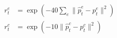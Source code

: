 \documentclass[border=8pt,12pt]{standalone}
\begin{document}
\color{ink}
$\displaystyle \begin{aligned}r_t^e&=\exp\!\left(-40\sum_e\|\hat p_t^e-p_t^e\|^2\right)\\ r_t^c&=\exp\!\left(-10\|\hat p_t^c-p_t^c\|^2\right)\end{aligned}$
\end{document}
